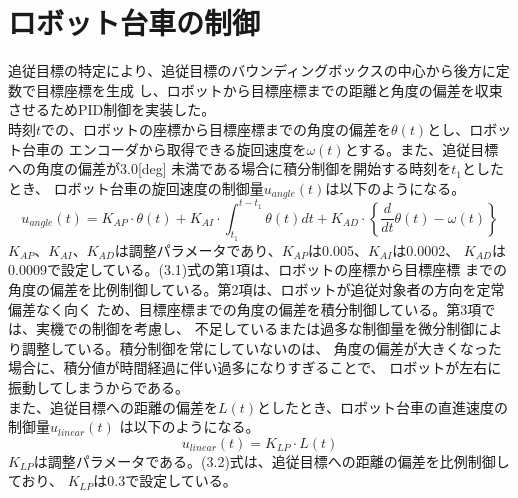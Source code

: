 \section{ロボット台車の制御}
追従目標の特定により、追従目標のバウンディングボックスの中心から後方に定数で目標座標を生成
し、ロボットから目標座標までの距離と角度の偏差を収束させるためPID制御を実装した。 \\ \indent
時刻$t$での、ロボットの座標から目標座標までの角度の偏差を$\theta(t)$とし、ロボット台車の
エンコーダから取得できる旋回速度を$\omega(t)$とする。また、追従目標への角度の偏差が3.0[deg]
未満である場合に積分制御を開始する時刻を$t_1$としたとき、
ロボット台車の旋回速度の制御量$u_{angle}(t)$は以下のようになる。
\begin{equation}
u_{angle}(t) = K_{AP} \cdot \theta(t)+ K_{AI} \cdot \int_{t_1}^{t-t_1} \theta(t) dt + K_{AD} \cdot \left\{ \frac{d}{dt} \theta(t) - \omega(t) \right\}
\end{equation}
$K_{AP}$、$K_{AI}$、$K_{AD}$は調整パラメータであり、$K_{AP}$は0.005、$K_{AI}$は0.0002、
$K_{AD}$は0.0009で設定している。(3.1)式の第1項は、ロボットの座標から目標座標
までの角度の偏差を比例制御している。第2項は、ロボットが追従対象者の方向を定常偏差なく向く
ため、目標座標までの角度の偏差を積分制御している。第3項では、実機での制御を考慮し、
不足しているまたは過多な制御量を微分制御により調整している。積分制御を常にしていないのは、
角度の偏差が大きくなった場合に、積分値が時間経過に伴い過多になりすぎることで、
ロボットが左右に振動してしまうからである。\\ \indent
また、追従目標への距離の偏差を$L(t)$としたとき、ロボット台車の直進速度の制御量$u_{linear}(t)$
は以下のようになる。
\begin{equation}
    u_{linear}(t) = K_{LP} \cdot L(t)
\end{equation}
$K_{LP}$は調整パラメータである。(3.2)式は、追従目標への距離の偏差を比例制御しており、
$K_{LP}$は0.3で設定している。

